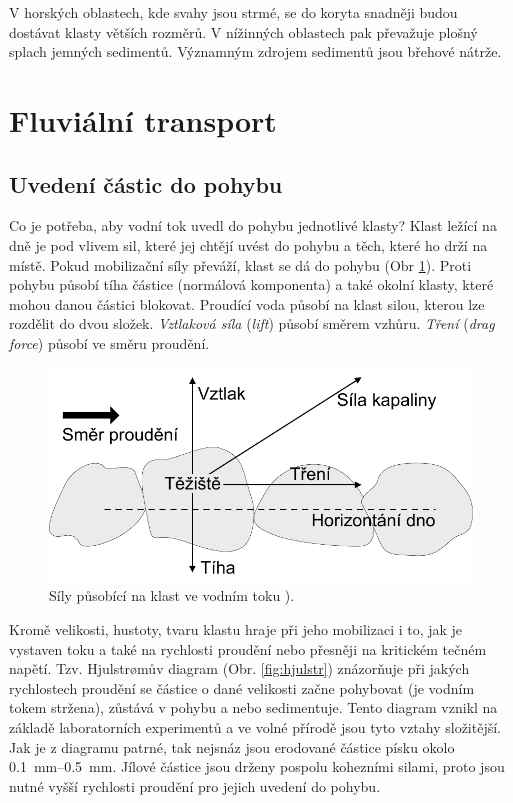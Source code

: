 V horských oblastech, kde svahy jsou strmé, se do koryta snadněji budou dostávat klasty větších rozměrů. V nížinných oblastech pak převažuje plošný splach jemných sedimentů. Významným zdrojem sedimentů jsou břehové nátrže. 

\section{Fluviální transport}
\subsection{Uvedení částic do pohybu}
Co je potřeba, aby vodní tok uvedl do pohybu jednotlivé klasty? Klast ležící na dně je pod vlivem sil, které jej chtějí uvést do pohybu a těch, které ho drží na místě. Pokud mobilizační síly převáží, klast se dá do pohybu (Obr \ref{fig:sily_klast}). Proti pohybu působí tíha částice (normálová komponenta) a také okolní klasty, které mohou danou částici blokovat. Proudící voda působí na klast silou, kterou lze rozdělit do dvou složek. \emph{Vztlaková síla} (\textit{lift}) působí směrem vzhůru. \emph{Tření} (\textit{drag force}) působí ve směru proudění. 

\begin{figure}
	\centering
	\includegraphics[width = 1\linewidth]{obrazky/fluvial/sily_klast}
	\caption{Síly působící na klast ve vodním toku \textcite{summerfieldGlobalGeomorphologyIntroduction1999}).}
	\label{fig:sily_klast}
\end{figure}

Kromě velikosti, hustoty, tvaru klastu hraje při jeho mobilizaci i to, jak je vystaven toku a také na rychlosti proudění nebo přesněji na kritickém tečném napětí. Tzv. Hjulstr\o{}mův diagram (Obr. \ref{fig:hjulstr}) znázorňuje při jakých rychlostech proudění se částice o dané velikosti začne pohybovat (je vodním tokem stržena), zůstává v pohybu a nebo sedimentuje. Tento diagram vznikl na základě laboratorních experimentů a ve volné přírodě jsou tyto vztahy složitější. Jak je z diagramu patrné, tak nejsnáz jsou erodované částice písku okolo \SIrange{0,1}{0,5}{\milli\metre}. Jílové částice jsou drženy pospolu kohezními silami, proto jsou nutné vyšší rychlosti proudění pro jejich uvedení do pohybu. 

